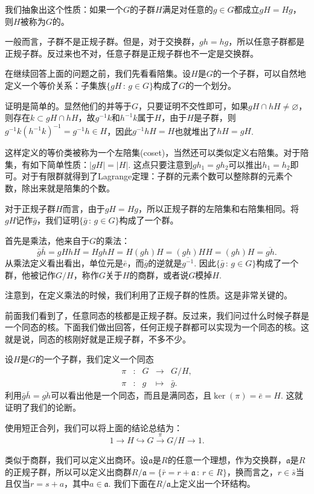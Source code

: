 我们抽象出这个性质：如果一个$G$的子群$H$满足对任意的$g\in G$都成立$gH=Hg$，则$H$被称为$G$的。

一般而言，子群不是正规子群。但是，对于交换群，$gh=hg$，所以任意子群都是正规子群。反过来也不对，任意子群是正规子群也不一定是交换群。

\para 在继续回答上面的问题之前，我们先看看陪集。设$H$是$G$的一个子群，可以自然地定义一个等价关系：子集族$\{gH\,:\, g\in G\}$构成了$G$的一个划分。

证明是简单的。显然他们的并等于$G$，只要证明不交性即可，如果$gH\cap hH\neq \varnothing$，则存在$k\subset gH\cap hH$，故$g^{-1}k$和$h^{-1}k$属于$H$，由于$H$是子群，则$g^{-1}k\left(h^{-1}k\right)^{-1}=g^{-1}h\in H$，因此$g^{-1}hH=H$也就堆出了$hH=gH$.

这样定义的等价类被称为一个左陪集(coset)，当然还可以类似定义右陪集。对于陪集，有如下简单性质：$|gH|=|H|$. 这点只要注意到$gh_1=gh_2$可以推出$h_1=h_2$即可。对于有限群就得到了Lagrange定理：子群的元素个数可以整除群的元素个数，除出来就是陪集的个数。

\para 对于正规子群$H$而言，由于$gH=Hg$，所以正规子群的左陪集和右陪集相同。将$gH$记作$\bar{g}$，我们证明$\{\bar{g}\,:\, g\in G\}$构成了一个群。

首先是乘法，他来自于$G$的乘法：
\[
	\bar{g}\bar{h}=gHhH=HghH=H(gh)H=(gh)HH=(gh)H=\overline{gh}.
\]
从乘法定义看出看出，单位元是$\bar{e}$，而$\bar{g}$的逆就是$\overline{g^{-1}}$. 因此$\{\bar{g}\,:\, g\in G\}$构成了一个群，他被记作$G/H$，称作$G$关于$H$的商群，或者说$G$模掉$H$.

注意到，在定义乘法的时候，我们利用了正规子群的性质。这是非常关键的。

\para 前面我们看到了，任意同态的核都是正规子群。反过来，我们问过什么时候子群是一个同态的核。下面我们做出回答，任何正规子群都可以实现为一个同态的核。这就是说，同态的核刚好就是正规子群，不多不少。

设$H$是$G$的一个子群，我们定义一个同态
\[
	\begin{array}{ccccc}
		\pi &:&G &\to& G/H,\\
		\pi &:&g &\mapsto& \bar{g}.
	\end{array}
\]
利用$\bar{g}\bar{h}=\overline{gh}$可以看出他是一个同态，而且是满同态，且$\ker(\pi)=\bar{e}=H$. 这就证明了我们的论断。

使用短正合列，我们可以将上面的结论总结为：
\[
	1\to H \hookrightarrow G \xrightarrow{\pi} G/H\to 1.
\]

\para 类似于商群，我们可以定义出商环。设$\mathfrak{a}$是$R$的任意一个理想，作为交换群，$\mathfrak{a}$是$R$的正规子群，所以可以定义出商群$R/\mathfrak{a}=\{\bar{r}=r+\mathfrak{a}\,:\, r\in R\}$，换而言之，$r\in \bar{s}$当且仅当$r=s+a$，其中$a\in \mathfrak{a}$. 我们下面在$R/\mathfrak{a}$上定义出一个环结构。

